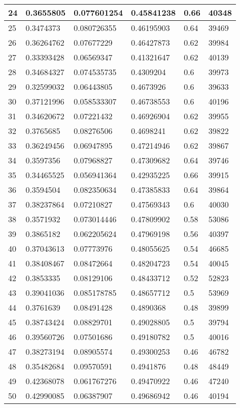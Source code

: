 \begin{longtable}{|l|l|l|l|l|l|}
24 & 0.3655805 & 0.077601254 & 0.45841238 & 0.66 & 40348 \\ \hline 
25 & 0.3474373 & 0.080726355 & 0.46195903 & 0.64 & 39469 \\ \hline 
26 & 0.36264762 & 0.07677229 & 0.46427873 & 0.62 & 39984 \\ \hline 
27 & 0.33393428 & 0.06569347 & 0.41321647 & 0.62 & 40139 \\ \hline 
28 & 0.34684327 & 0.074535735 & 0.4309204 & 0.6 & 39973 \\ \hline 
29 & 0.32599032 & 0.06443805 & 0.4673926 & 0.6 & 39633 \\ \hline 
30 & 0.37121996 & 0.058533307 & 0.46738553 & 0.6 & 40196 \\ \hline 
31 & 0.34620672 & 0.07221432 & 0.46926904 & 0.62 & 39955 \\ \hline 
32 & 0.3765685 & 0.08276506 & 0.4698241 & 0.62 & 39822 \\ \hline 
33 & 0.36249456 & 0.06947895 & 0.47214946 & 0.62 & 39867 \\ \hline 
34 & 0.3597356 & 0.07968827 & 0.47309682 & 0.64 & 39746 \\ \hline 
35 & 0.34465525 & 0.056941364 & 0.42935225 & 0.66 & 39915 \\ \hline 
36 & 0.3594504 & 0.082350634 & 0.47385833 & 0.64 & 39864 \\ \hline 
37 & 0.38237864 & 0.07210827 & 0.47569343 & 0.6 & 40030 \\ \hline 
38 & 0.3571932 & 0.073014446 & 0.47809902 & 0.58 & 53086 \\ \hline 
39 & 0.3865182 & 0.062205624 & 0.47969198 & 0.56 & 40397 \\ \hline 
40 & 0.37043613 & 0.07773976 & 0.48055625 & 0.54 & 46685 \\ \hline 
41 & 0.38408467 & 0.08472664 & 0.48204723 & 0.54 & 40045 \\ \hline 
42 & 0.3853335 & 0.08129106 & 0.48433712 & 0.52 & 52823 \\ \hline 
43 & 0.39041036 & 0.085178785 & 0.48657712 & 0.5 & 53969 \\ \hline 
44 & 0.3761639 & 0.08491428 & 0.4890368 & 0.48 & 39899 \\ \hline 
45 & 0.38743424 & 0.08829701 & 0.49028805 & 0.5 & 39794 \\ \hline 
46 & 0.39560726 & 0.07501686 & 0.49180782 & 0.5 & 40016 \\ \hline 
47 & 0.38273194 & 0.08905574 & 0.49300253 & 0.46 & 46782 \\ \hline 
48 & 0.35482684 & 0.09570591 & 0.4941876 & 0.48 & 48449 \\ \hline 
49 & 0.42368078 & 0.061767276 & 0.49470922 & 0.46 & 47240 \\ \hline 
50 & 0.42990085 & 0.06387907 & 0.49686942 & 0.46 & 40194 \\ \hline 
\end{longtable}